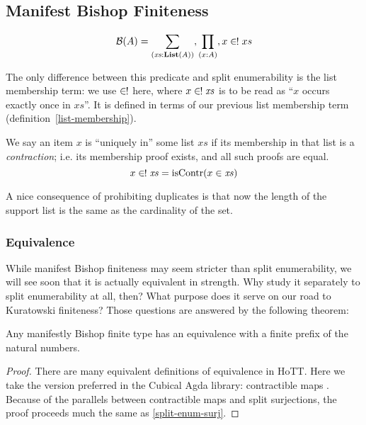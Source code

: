 \begin{refsection}
\subsection{Manifest Bishop Finiteness} \label{manifest-bishop}
\begin{definition}
  \begin{equation}
    \mathcal{B}(A) = \sum_{(\mathit{xs} : \textbf{List}(A))} , \prod_{(x : A)} , x \inunique xs
  \end{equation}
\end{definition}
The only difference between this predicate and split enumerability is the list
membership term: we use \(\inunique\) here, where \(x \inunique \mathit{xs}\) is
to be read as ``\(x\) occurs exactly once in \(\mathit{xs}\)''.
It is defined in terms of our previous list membership term
(definition~\ref{list-membership}).
\begin{definition}
  We say an item \(x\) is ``uniquely in'' some list \(\mathit{xs}\) if its
  membership in that list is a \emph{contraction}; i.e. its membership proof
  exists, and all such proofs are equal.
  \begin{equation}
    x \inunique \mathit{xs} = \text{isContr}(x \in \mathit{xs})
  \end{equation}
\end{definition}

A nice consequence of prohibiting duplicates is that now the length of the
support list is the same as the cardinality of the set.
\subsubsection{Equivalence}
While manifest Bishop finiteness may seem stricter than split enumerability, we
will see soon that it is actually equivalent in strength.
Why study it separately to split enumerability at all, then?
What purpose does it serve on our road to Kuratowski finiteness?
Those questions are answered by the following theorem:
\begin{lemma} \label{bishop-equiv}
  Any manifestly Bishop finite type has an equivalence with a finite prefix of
  the natural numbers.
\end{lemma}
\begin{proof}
  There are many equivalent definitions of equivalence in HoTT.
  Here we take the version preferred in the Cubical Agda library: contractible
  maps \cite[Definition~4.4.1]{hottbook}. 
  Because of the parallels between contractible maps and split surjections,
  the proof proceeds much the same as \ref{split-enum-surj}.


\end{proof}
\end{refsection}
